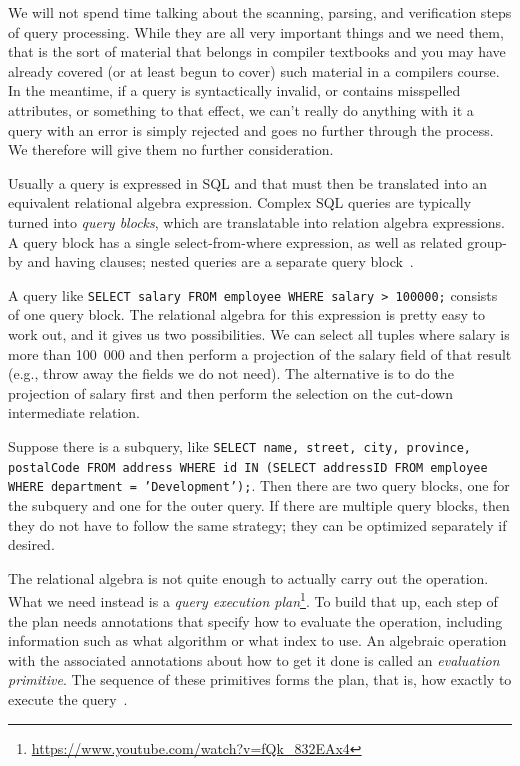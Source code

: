We will not spend time talking about the scanning, parsing, and verification steps of query processing. While they are all very important things and we need them, that is the sort of material that belongs in compiler textbooks and you may have already covered (or at least begun to cover) such material in a compilers course. In the meantime, if a query is syntactically invalid, or contains misspelled attributes, or something to that effect, we can't really do anything with it a query with an error is simply rejected and  goes no further through the process. We therefore will give them no further consideration.

Usually a query is expressed in SQL and that must then be translated into an equivalent relational algebra expression. Complex SQL queries are typically turned into \textit{query blocks}, which are translatable into relation algebra expressions. A query block has a single select-from-where expression, as well as related group-by and having clauses; nested queries are a separate query block~\cite{fds}.

A query like \texttt{SELECT salary FROM employee WHERE salary > 100000;} consists of one query block. The relational algebra for this expression is pretty easy to work out, and it gives us two possibilities. We can select all tuples where salary is more than 100~000 and then perform a projection of the salary field of that result (e.g., throw away the fields we do not need). The alternative is to do the projection of salary first and then perform the selection on the cut-down intermediate relation.

Suppose there is a subquery, like \texttt{SELECT name, street, city, province, postalCode FROM address WHERE id IN (SELECT addressID FROM employee WHERE department = 'Development');}. Then there are two query blocks, one for the subquery and one for the outer query. If there are multiple query blocks, then they do not have to follow the same strategy; they can be optimized separately if desired. 

The relational algebra is not quite enough to actually carry out the operation. What we need instead is a \textit{query execution plan}\footnote{\url{https://www.youtube.com/watch?v=fQk_832EAx4}}. To build that up, each step of the plan needs annotations that specify how to evaluate the operation, including information such as what algorithm or what index to use. An algebraic operation with the associated annotations about how to get it done is called an \textit{evaluation primitive}. The sequence of these primitives forms the plan, that is, how exactly to execute the query~\cite{dsc}. 

